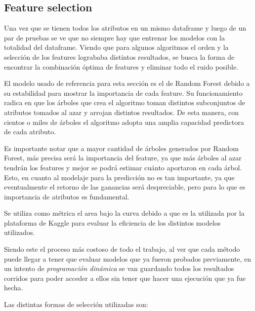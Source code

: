 \documentclass[a4paper]{article}
\begin{document}
\subsection{Feature selection}

Una vez que se tienen todos los atributos en un mismo dataframe y luego de un par de pruebas se ve que no siempre hay que entrenar los modelos con la totalidad del dataframe. Viendo que para algunos algoritmos el orden y la selección de los features logrababa distintos resultados, se busca la forma de encontrar la combinación óptima de features y eliminar todo el ruido posible.

El modelo usado de referencia para esta sección es el de Random Forest debido a su estabilidad para mostrar la importancia de cada feature. Su funcionamiento radica en que los árboles que crea el algoritmo toman distintos subconjuntos de atributos tomados al azar y arrojan distintos resultados. De esta manera, con cientos o miles de árboles el algoritmo adopta una amplia capacidad predictora de cada atributo.

Es importante notar que a mayor cantidad de árboles generados por Random Forest, más precisa será la importancia del feature, ya que más árboles al azar tendrán los features y mejor se podrá estimar cuánto aportaron en cada árbol. Esto, en cuanto al modelaje para la predicción no es tan importante, ya que eventualmente el retorno de las ganancias será despreciable, pero para lo que es importancia de atributos es fundamental.

Se utiliza como métrica el area bajo la curva debido a que es la utilizada por la plataforma de Kaggle para evaluar la eficiencia de los distintos modelos utilizados. 

Siendo este el proceso más costoso de todo el trabajo, al ver que cada método puede llegar a tener que evaluar modelos que ya fueron probados previamente, en un intento de \textit{programación dinámica} se van guardando todos los resultados corridos para poder acceder a ellos sin tener que hacer una ejecución que ya fue hecha.

Las distintas formas de selección utilizadas son:
\end{document}
